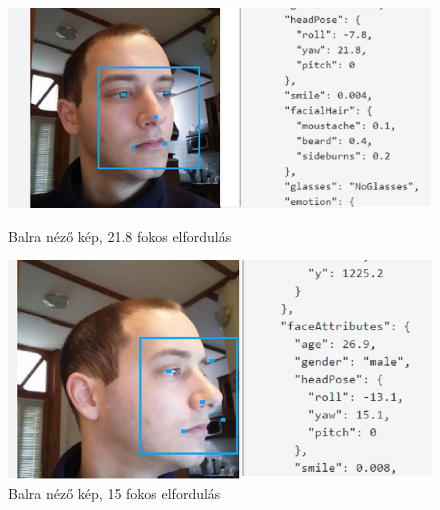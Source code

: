 \begin{figure}[h]
 \begin{minipage}{.5\textwidth} 
    \includegraphics[scale=0.3]{img/mpo_left}
    \caption{Balra néző kép, 21.8 fokos \newline elfordulás}
 \end{minipage}
 \begin{minipage}{.5\textwidth} 
     \includegraphics[scale=0.3]{img/mpo_very_left}
     \caption{Balra néző kép, 15 fokos elfordulás}
 \end{minipage}
\end{figure}

